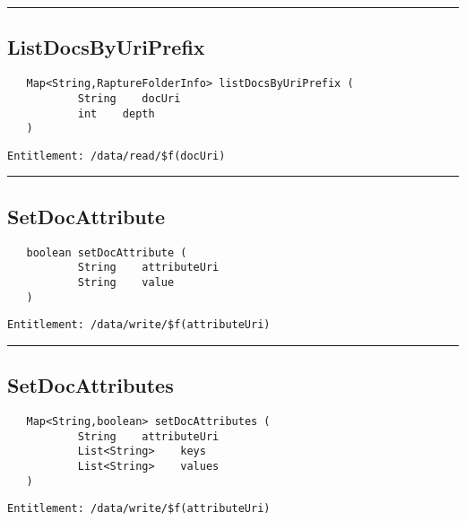 \rule{12cm}{2pt}
\subsection{ListDocsByUriPrefix}
\label{Api:ListDocsByUriPrefix}
\begin{Verbatim}
   Map<String,RaptureFolderInfo> listDocsByUriPrefix (
           String    docUri
           int    depth
   )
\end{Verbatim}
\begin{Verbatim}[formatcom=\color{Maroon}]
  Entitlement: /data/read/$f(docUri)
\end{Verbatim}



\rule{12cm}{2pt}
\subsection{SetDocAttribute}
\label{Api:SetDocAttribute}
\begin{Verbatim}
   boolean setDocAttribute (
           String    attributeUri
           String    value
   )
\end{Verbatim}
\begin{Verbatim}[formatcom=\color{Maroon}]
  Entitlement: /data/write/$f(attributeUri)
\end{Verbatim}



\rule{12cm}{2pt}
\subsection{SetDocAttributes}
\label{Api:SetDocAttributes}
\begin{Verbatim}
   Map<String,boolean> setDocAttributes (
           String    attributeUri
           List<String>    keys
           List<String>    values
   )
\end{Verbatim}
\begin{Verbatim}[formatcom=\color{Maroon}]
  Entitlement: /data/write/$f(attributeUri)
\end{Verbatim}



